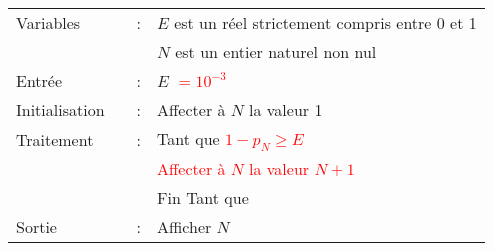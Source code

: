 \documentclass[12pt,a4paper]{article}
\theoremstyle{break}
\theoremstyle{nobreak}
\theoremstyle{nonumberplain}
\begin{document}
\begin{tabular}{p{5em}p{0.1em}cp{20em}}
  Variables      &  & : & $E$ est un réel strictement compris entre 0 et 1 \\
                 &  &   & $N$ est un entier naturel non nul                           \\
  Entrée         &  & : & $E$ \textcolor{red}{$=10^{-3}$}                              \\
  Initialisation &  & : & Affecter à $N$ la valeur 1                                  \\
  Traitement     &  & : & Tant que \textcolor{red}{$1-p_N\geqslant E$}                \\
                 &  &   & \hspace{1em}\textcolor{red}{Affecter à $N$ la valeur $N+1$} \\
                 &  &   & Fin Tant que                                                \\
  Sortie         &  & : & Afficher $N$                                                \\
\end{tabular}
\end{document}
